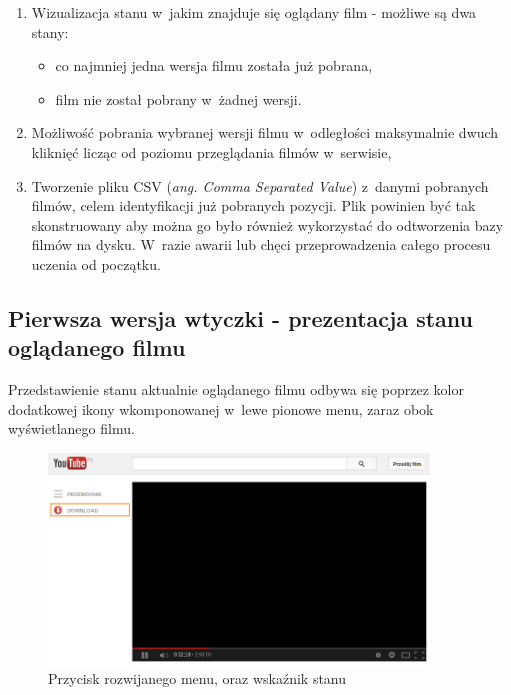 \begin{enumerate}
    \item Wizualizacja stanu w~jakim znajduje się oglądany film - 
        możliwe są dwa stany:
    \begin{itemize}
        \item co najmniej jedna wersja filmu została już pobrana,
        \item film nie został pobrany w~żadnej wersji.
    \end{itemize}
    \item Możliwość pobrania wybranej wersji filmu w~odległości maksymalnie
        dwuch kliknięć licząc od poziomu przeglądania filmów w~serwisie,
    \item Tworzenie pliku CSV (\textit{ang. Comma Separated Value})
        z~danymi pobranych filmów, celem identyfikacji już pobranych
        pozycji. Plik powinien być tak skonstruowany aby można go było
        również wykorzystać do odtworzenia bazy filmów na dysku. W~razie
        awarii lub chęci przeprowadzenia całego procesu uczenia od
        początku.
\end{enumerate}

\subsection{Pierwsza wersja wtyczki - prezentacja stanu oglądanego filmu}

Przedstawienie stanu aktualnie oglądanego filmu odbywa się poprzez
kolor dodatkowej ikony wkomponowanej w~lewe pionowe menu, zaraz obok
wyświetlanego filmu.

\begin{figure}[h!]
    \caption{Przycisk rozwijanego menu, oraz wskaźnik stanu}
    \centering
    \includegraphics[width=0.9\textwidth]{img/env_yt_dwn_indicator}
\end{figure}

